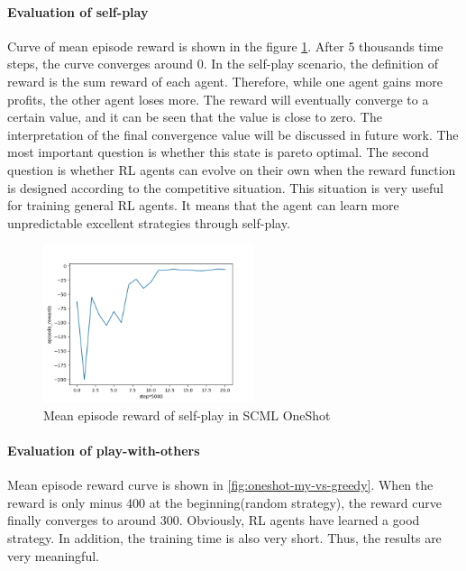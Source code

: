 \paragraph{Evaluation of self-play} 
Curve of mean episode reward is shown in the figure \ref{fig:oneshot-self-play}. After 5 thousands time steps, the curve converges around 0. In the self-play scenario, the definition of reward is the sum reward of each agent. Therefore, while one agent gains more profits, the other agent loses more. The reward will eventually converge to a certain value, and it can be seen that the value is close to zero. The interpretation of the final convergence value will be discussed in future work. The most important question is whether this state is pareto optimal. The second question is whether RL agents can evolve on their own when the reward function is designed according to the competitive situation. This situation is very useful for training general RL agents. It means that the agent can learn more unpredictable excellent strategies through self-play.

\begin{figure}[htbp]
\centering
\includegraphics[width=0.55\textwidth]{./images/oneshot_self_play.png}
\caption{Mean episode reward of self-play in SCML OneShot}
\label{fig:oneshot-self-play}
\end{figure}

\paragraph{Evaluation of play-with-others}

Mean episode reward curve is shown in \ref{fig:oneshot-my-vs-greedy}. When the reward is only minus 400 at the beginning(random strategy), the reward curve finally converges to around 300. Obviously, RL agents have learned a good strategy. In addition, the training time is also very short. Thus, the results are very meaningful.

